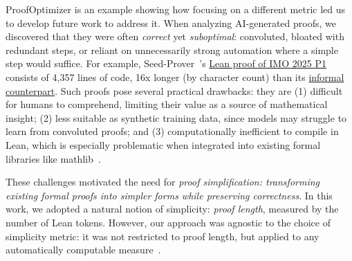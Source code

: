 
ProofOptimizer is an example showing how focusing on a different metric led us to develop future work to address it.
When analyzing AI-generated proofs, we discovered that they were often \textit{correct} yet \textit{suboptimal}: convoluted, bloated with redundant steps, or reliant on unnecessarily strong automation where a simple step would suffice.
For example, Seed-Prover~\citep{chen2507seed}'s \href{https://github.com/ByteDance-Seed/Seed-Prover/blob/17f89e327e4f90f46b0af385efc233dbbe71f8bb/SeedProver/imo2025/IMO2025/P1.lean}{Lean proof of IMO 2025 P1} consists of 4,357 lines of code, 16x longer (by character count) than its \href{https://github.com/ByteDance-Seed/Seed-Prover/blob/17f89e327e4f90f46b0af385efc233dbbe71f8bb/SeedProver/imo2025/p1_proof.pdf}{informal counterpart}. Such proofs pose several practical drawbacks: they are
(1) difficult for humans to comprehend, limiting their value as a source of mathematical insight; (2) less suitable as synthetic training data, since models may struggle to learn from convoluted proofs; and
(3) computationally inefficient to compile in Lean, which is especially problematic when integrated into existing formal libraries like mathlib~\citep{mathlib}.

These challenges motivated the need for \emph{proof simplification: transforming existing formal proofs into simpler forms while preserving correctness}. In this work, we adopted a natural notion of simplicity: \textit{proof length}, measured by the number of Lean tokens. However, our approach was agnostic to the choice of simplicity metric: it was not restricted to proof length, but applied to any automatically computable measure~\citep{kinyon-proof-simp}.







